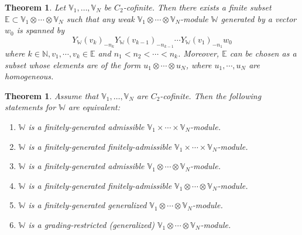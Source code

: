 \documentclass[11pt,b5paper,notitlepage]{article}
\theoremstyle{definition}
\theoremstyle{plain}
\newtheorem{thm}[df]{Theorem}
\newcommand{\wtd}{\widetilde}
\newcommand{\Vbb}{\mathbb V}
\newcommand{\Wbb}{\mathbb W}
\newcommand{\Nbb}{\mathbb N}
\newcommand{\Ebb}{\mathbb E}
\newcommand{\<}{\left\langle}
\renewcommand{\>}{\right\rangle}
\numberwithin{equation}{section}
\begin{document}
\begin{thm}\label{Miy}
    Let $\Vbb_1,\dots,\Vbb_N$ be $C_2$-cofinite. Then there exists a finite subset $\Ebb\subset \Vbb_1\otimes\cdots\otimes\Vbb_N$ such that any weak $\Vbb_1\otimes\cdots\otimes\Vbb_N$-module $\Wbb$ generated by a vector $w_0$ is spanned by 
    \begin{equation}\label{finiteness1}
    Y_{\Wbb}(v_k)_{-n_k}Y_\Wbb(v_{k-1})_{-n_{k-1}}\cdots Y_\Wbb(v_1)_{-n_1}w_0
    \end{equation}
    where $k\in \Nbb,v_1,\cdots,v_k\in \Ebb$ and $n_1<n_2<\cdots<n_k$. Moreover, $\Ebb$ can be chosen as a subset whose elements are of the form $u_1\otimes \cdots \otimes u_N$, where $u_1,\cdots,u_N$ are homogeneous. 
\end{thm}




\begin{thm}\label{lb46}
Assume that $\Vbb_1,\dots,\Vbb_N$ are $C_2$-cofinite. Then the following statements for $\Wbb$ are equivalent:
\begin{enumerate}[label=(\alph*)]
\item $\Wbb$ is a finitely-generated admissible $\Vbb_1\times\cdots\times\Vbb_N$-module.
\item $\Wbb$ is a finitely-generated finitely-admissible $\Vbb_1\times\cdots\times\Vbb_N$-module.
\item $\Wbb$ is a finitely-generated admissible $\Vbb_1\otimes\cdots\otimes\Vbb_N$-module.
\item $\Wbb$ is a finitely-generated finitely-admissible $\Vbb_1\otimes\cdots\otimes\Vbb_N$-module.
\item $\Wbb$ is a finitely-generated generalized $\Vbb_1\otimes\cdots\otimes\Vbb_N$-module.
\item $\Wbb$ is a grading-restricted (generalized) $\Vbb_1\otimes\cdots\otimes\Vbb_N$-module.
\end{enumerate}
\end{thm}
\end{document}
